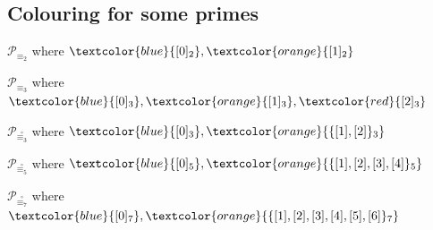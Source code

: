 \documentclass[10pt,serif, professionalfont]{beamer}
\begin{document}
\subsection{Colouring for some primes}


\begin{frame}{$\mathcal{P}_{\equiv_{2}}$ where 
    $\textcolor{blue}{[0]_{2}},\textcolor{orange}{[1]_{2}}$}

    
\end{frame}

\begin{frame}{$\mathcal{P}_{\equiv_{3}}$ where 
    $\textcolor{blue}{[0]_{3}},\textcolor{orange}{[1]_{3}},\textcolor{red}{[2]_{3}}$}

    
\end{frame}
\begin{frame}{$\mathcal{P}_{\stackrel{\circ}{\equiv_{3}}}$ where 
    $\textcolor{blue}{[0]_{3}},\textcolor{orange}{\lbrace [1],[2] \rbrace_{3}}$}

    
\end{frame}
\begin{frame}{$\mathcal{P}_{\stackrel{\circ}{\equiv_{5}}}$ where 
    $\textcolor{blue}{[0]_{5}},\textcolor{orange}{\lbrace [1],[2],[3],[4] \rbrace_{5}}$}

    
\end{frame}
\begin{frame}{$\mathcal{P}_{\stackrel{\circ}{\equiv_{7}}}$ where 
    $\textcolor{blue}{[0]_{7}},\textcolor{orange}{\lbrace [1],[2],[3],[4],[5],[6] \rbrace_{7}}$}

    
\end{frame}

\end{document}
